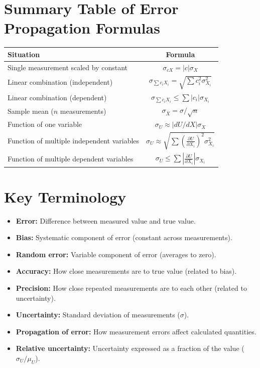 \documentclass[11pt]{article}
\begin{document}
\section*{Summary Table of Error Propagation Formulas}
{\small
\begin{center}
\begin{tabular}{l c}
\toprule
\textbf{Situation} & \textbf{Formula} \\
\midrule
Single measurement scaled by constant & \(\sigma_{cX} = |c|\sigma_X\) \\
Linear combination (independent) & \(\sigma_{\sum c_iX_i} = \sqrt{\sum c_i^2\sigma_{X_i}^2}\) \\
Linear combination (dependent) & \(\sigma_{\sum c_iX_i} \leq \sum |c_i|\sigma_{X_i}\) \\
Sample mean (\(n\) measurements) & \(\sigma_{\bar{X}} = \sigma/\sqrt{n}\) \\
Function of one variable & \(\sigma_U \approx |dU/dX|\sigma_X\) \\
Function of multiple independent variables & \(\sigma_U \approx \sqrt{\sum \left(\frac{\partial U}{\partial X_i}\right)^2\sigma_{X_i}^2}\) \\
Function of multiple dependent variables & \(\sigma_U \leq \sum \left|\frac{\partial U}{\partial X_i}\right|\sigma_{X_i}\) \\
\bottomrule
\end{tabular}
\end{center}
}

\section*{Key Terminology}
\begin{itemize}[nosep]
    \item \textbf{Error:} Difference between measured value and true value.
    \item \textbf{Bias:} Systematic component of error (constant across measurements).
    \item \textbf{Random error:} Variable component of error (averages to zero).
    \item \textbf{Accuracy:} How close measurements are to true value (related to bias).
    \item \textbf{Precision:} How close repeated measurements are to each other (related to uncertainty).
    \item \textbf{Uncertainty:} Standard deviation of measurements (\(\sigma\)).
    \item \textbf{Propagation of error:} How measurement errors affect calculated quantities.
    \item \textbf{Relative uncertainty:} Uncertainty expressed as a fraction of the value (\(\sigma_U/\mu_U\)).
\end{itemize}
\end{document}
